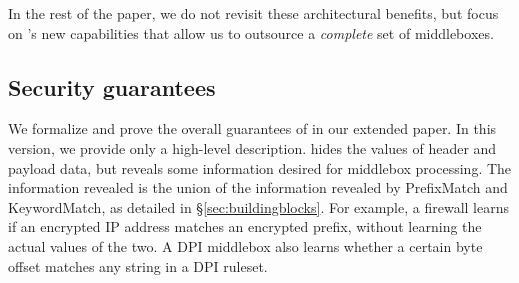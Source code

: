 In the rest of the paper, we do not revisit these architectural benefits, but focus  on \sys's new capabilities that allow us to outsource a {\it complete} set of middleboxes.

\subsection{Security guarantees}

We formalize and prove the overall guarantees of \sys in our extended paper. In this version, we provide only  a high-level description. 
\sys hides the values of header and payload data, but reveals some information desired for middlebox processing. The information revealed is the union of the information revealed by PrefixMatch and KeywordMatch, as detailed in \S\ref{sec:buildingblocks}. For example, a firewall learns if an encrypted IP address matches an encrypted prefix, without learning the actual values of the two. A DPI middlebox also learns whether a certain byte offset matches any string in a DPI ruleset. 

